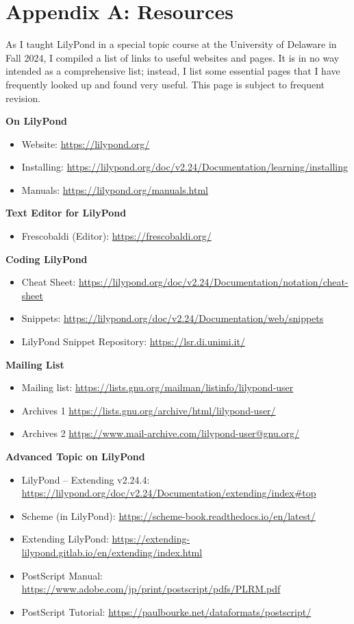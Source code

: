 
\chapter{Appendix A: Resources}

As I taught LilyPond in a special topic course at the University of Delaware in Fall 2024, I compiled a list of links to useful websites and pages. It is in no way intended as a comprehensive list; instead, I list some essential pages that I have frequently looked up and found very useful. This page is subject to frequent revision.

\textbf{On LilyPond}
\begin{itemize}
\item Website:	\url{https://lilypond.org/}
\item Installing: \url{https://lilypond.org/doc/v2.24/Documentation/learning/installing}
\item Manuals: \url{https://lilypond.org/manuals.html} 
\end{itemize}
\textbf{Text Editor for LilyPond}
\begin{itemize}
\item Frescobaldi (Editor):	\url{https://frescobaldi.org/}
\end{itemize}
\textbf{Coding LilyPond}
\begin {itemize}
\item Cheat Sheet:	\url{https://lilypond.org/doc/v2.24/Documentation/notation/cheat-sheet}
\item Snippets:	\url{https://lilypond.org/doc/v2.24/Documentation/web/snippets}
\item LilyPond Snippet Repository:	\url{https://lsr.di.unimi.it/}
\end{itemize}
\textbf{Mailing List}
\begin {itemize}
\item Mailing list:		\url{https://lists.gnu.org/mailman/listinfo/lilypond-user} 
\item Archives 1 \url{https://lists.gnu.org/archive/html/lilypond-user/}
\item Archives 2 \url{https://www.mail-archive.com/lilypond-user@gnu.org/} 
\end{itemize}
\textbf{Advanced Topic on LilyPond}
\begin {itemize}
\item LilyPond – Extending v2.24.4: \url{https://lilypond.org/doc/v2.24/Documentation/extending/index#top} 
\item Scheme (in LilyPond):	\url{https://scheme-book.readthedocs.io/en/latest/} 
\item Extending LilyPond: \url{https://extending-lilypond.gitlab.io/en/extending/index.html}
\item PostScript Manual: \url{https://www.adobe.com/jp/print/postscript/pdfs/PLRM.pdf}
\item PostScript Tutorial: \url{https://paulbourke.net/dataformats/postscript/}
\end{itemize}
